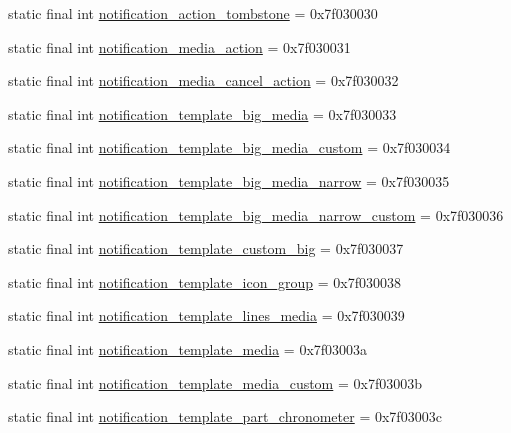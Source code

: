 \begin{CompactItemize}
\item 
static final int \hyperlink{classandroid_1_1support_1_1v4_1_1_r_1_1layout_ce1e8f5b115b41aba8132790bea446e0}{notification\_\-action\_\-tombstone} = 0x7f030030
\item 
static final int \hyperlink{classandroid_1_1support_1_1v4_1_1_r_1_1layout_a518ce36468bf6fbab90c452dfb6ca47}{notification\_\-media\_\-action} = 0x7f030031
\item 
static final int \hyperlink{classandroid_1_1support_1_1v4_1_1_r_1_1layout_2c25616b4255c93ec455d5bb77c18ec9}{notification\_\-media\_\-cancel\_\-action} = 0x7f030032
\item 
static final int \hyperlink{classandroid_1_1support_1_1v4_1_1_r_1_1layout_0c1d4d58c9f4b306809cce3929e61365}{notification\_\-template\_\-big\_\-media} = 0x7f030033
\item 
static final int \hyperlink{classandroid_1_1support_1_1v4_1_1_r_1_1layout_f51da8ce493d62ba0bab72eaa84416e7}{notification\_\-template\_\-big\_\-media\_\-custom} = 0x7f030034
\item 
static final int \hyperlink{classandroid_1_1support_1_1v4_1_1_r_1_1layout_36f9412e782172dc3aed729f11ac1826}{notification\_\-template\_\-big\_\-media\_\-narrow} = 0x7f030035
\item 
static final int \hyperlink{classandroid_1_1support_1_1v4_1_1_r_1_1layout_5e15c86269cd8d07f9282fd52c3985d5}{notification\_\-template\_\-big\_\-media\_\-narrow\_\-custom} = 0x7f030036
\item 
static final int \hyperlink{classandroid_1_1support_1_1v4_1_1_r_1_1layout_792f6fab0c9f84ee30f4f269a454d50e}{notification\_\-template\_\-custom\_\-big} = 0x7f030037
\item 
static final int \hyperlink{classandroid_1_1support_1_1v4_1_1_r_1_1layout_f115fa0d70640fa6a4e3f1d86b25277e}{notification\_\-template\_\-icon\_\-group} = 0x7f030038
\item 
static final int \hyperlink{classandroid_1_1support_1_1v4_1_1_r_1_1layout_891fc5cb274168645e00417ebe5c2847}{notification\_\-template\_\-lines\_\-media} = 0x7f030039
\item 
static final int \hyperlink{classandroid_1_1support_1_1v4_1_1_r_1_1layout_81843cfbbac185b926a830a99ae1a792}{notification\_\-template\_\-media} = 0x7f03003a
\item 
static final int \hyperlink{classandroid_1_1support_1_1v4_1_1_r_1_1layout_6f1f811a54d7c2b59a50b208c28a8317}{notification\_\-template\_\-media\_\-custom} = 0x7f03003b
\item 
static final int \hyperlink{classandroid_1_1support_1_1v4_1_1_r_1_1layout_a65ad7e812773a39cf50d5cf5b04e36c}{notification\_\-template\_\-part\_\-chronometer} = 0x7f03003c

\end{CompactItemize}
